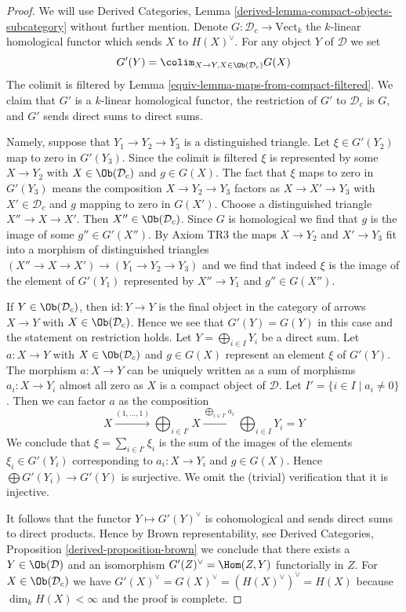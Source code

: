 \begin{proof}

We will use Derived Categories, Lemma
\ref{derived-lemma-compact-objects-subcategory} without further mention.
Denote $G : \mathcal{D}_c \to \text{Vect}_k$ the $k$-linear homological
functor which sends $X$ to $H(X)^\vee$. For any object $Y$ of $\mathcal{D}$
we set
$$
G'(Y) = \colim_{X \to Y, X \in \Ob(\mathcal{D}_c)} G(X)
$$
The colimit is filtered by Lemma \ref{equiv-lemma-maps-from-compact-filtered}.
We claim that $G'$ is a $k$-linear homological functor,
the restriction of $G'$ to $\mathcal{D}_c$ is $G$, and $G'$
sends direct sums to direct sums.

\medskip\noindent
Namely, suppose that $Y_1 \to Y_2 \to Y_3$ is a distinguished triangle.
Let $\xi \in G'(Y_2)$ map to zero in $G'(Y_3)$. Since the colimit is
filtered $\xi$ is represented by some $X \to Y_2$ with
$X \in \Ob(\mathcal{D}_c)$ and $g \in G(X)$.
The fact that $\xi$ maps to zero in $G'(Y_3)$ means the composition
$X \to Y_2 \to Y_3$ factors as $X \to X' \to Y_3$ with $X' \in \mathcal{D}_c$
and $g$ mapping to zero in $G(X')$. Choose a distinguished
triangle $X'' \to X \to X'$. Then $X'' \in \Ob(\mathcal{D}_c)$.
Since $G$ is homological we find that $g$ is the image of some
$g'' \in G'(X'')$. By Axiom TR3 the maps $X \to Y_2$ and $X' \to Y_3$ fit into
a morphism of distinguished triangles
$(X'' \to X \to X') \to (Y_1 \to Y_2 \to Y_3)$
and we find that indeed $\xi$ is the image of the
element of $G'(Y_1)$ represented by $X'' \to Y_1$ and $g'' \in G(X'')$.

\medskip\noindent
If $Y \in \Ob(\mathcal{D}_c)$, then $\text{id} : Y \to Y$ is the final
object in the category of arrows $X \to Y$ with $X \in \Ob(\mathcal{D}_c)$.
Hence we see that $G'(Y) = G(Y)$ in this case and the
statement on restriction holds. Let $Y = \bigoplus_{i \in I} Y_i$
be a direct sum. Let $a : X \to Y$ with $X \in \Ob(\mathcal{D}_c)$
and $g \in G(X)$ represent an element $\xi$ of $G'(Y)$.
The morphism $a : X \to Y$ can be uniquely written as a sum of morphisms
$a_i : X \to Y_i$ almost all zero as $X$ is a compact object of $\mathcal{D}$.
Let $I' = \{i \in I \mid a_i \not = 0\}$. Then we can factor
$a$ as the composition
$$
X \xrightarrow{(1, \ldots, 1)}
\bigoplus\nolimits_{i \in I'} X
\xrightarrow{\bigoplus_{i \in I'} a_i}
\bigoplus\nolimits_{i \in I} Y_i = Y
$$
We conclude that $\xi = \sum_{i \in I'} \xi_i$
is the sum of the images of the elements
$\xi_i \in G'(Y_i)$ corresponding to $a_i : X \to Y_i$
and $g \in G(X)$. Hence $\bigoplus G'(Y_i) \to G'(Y)$
is surjective. We omit the (trivial) verification that it is injective.

\medskip\noindent
It follows that the functor $Y \mapsto G'(Y)^\vee$ is cohomological
and sends direct sums to direct products. Hence by Brown representability,
see Derived Categories, Proposition \ref{derived-proposition-brown}
we conclude that there exists a $Y \in \Ob(\mathcal{D})$
and an isomorphism
$G'(Z)^\vee = \Hom(Z, Y)$ functorially in $Z$.
For $X \in \Ob(\mathcal{D}_c)$ we have
$G'(X)^\vee = G(X)^\vee = (H(X)^\vee)^\vee = H(X)$
because $\dim_k H(X) < \infty$ and the proof is complete.
\end{proof}

